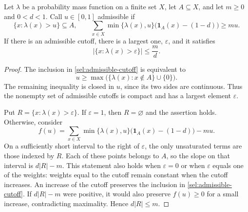 \begin{lemma}
\label{sel:truncation}
Let $\lambda$ be a probability mass function on a finite set $X$,
let $A\subseteq X$, and let $m\ge 0$ and $0<d<1$.
Call $u\in[0,1]$ admissible if
\begin{equation}
\label{sel:admissible-cutoff}
  \{x:\lambda(x)>u\}\subseteq A,
  \qquad
  \sum_{x\in X}\min\{\lambda(x),u\}
       \bigl(\mathbf 1_A(x)-(1-d)\bigr)\ge mu.
\end{equation}
If there is an admissible cutoff, there is a largest one,
$\varepsilon$, and it satisfies
\[
  |\{x:\lambda(x)>\varepsilon\}|\le \frac{m}{d}.
\]
\end{lemma}

\begin{proof}
The inclusion in \eqref{sel:admissible-cutoff} is equivalent to
\[
  u\ge \max\bigl(\{\lambda(x):x\notin A\}\cup\{0\}\bigr).
\]
The remaining inequality is closed in $u$, since its two sides are
continuous.  Thus the nonempty set of admissible cutoffs is compact
and has a largest element $\varepsilon$.

Put $R=\{x:\lambda(x)>\varepsilon\}$.  If $\varepsilon=1$, then
$R=\varnothing$ and the assertion holds.  Otherwise, consider
\[
  f(u)=\sum_{x\in X}\min\{\lambda(x),u\}
          \bigl(\mathbf 1_A(x)-(1-d)\bigr)-mu.
\]
On a sufficiently short interval to the right of $\varepsilon$, the
only unsaturated terms are those indexed by $R$.  Each of these
points belongs to $A$, so the slope on that interval is
$d|R|-m$.  This statement also holds when $\varepsilon=0$ or when
$\varepsilon$ equals one of the weights: weights equal to the cutoff
remain constant when the cutoff increases.  An increase of the
cutoff preserves the inclusion in \eqref{sel:admissible-cutoff}.
If $d|R|-m$ were positive, it would also preserve $f(u)\ge 0$ for a
small increase, contradicting maximality.  Hence $d|R|\le m$.
\end{proof}

